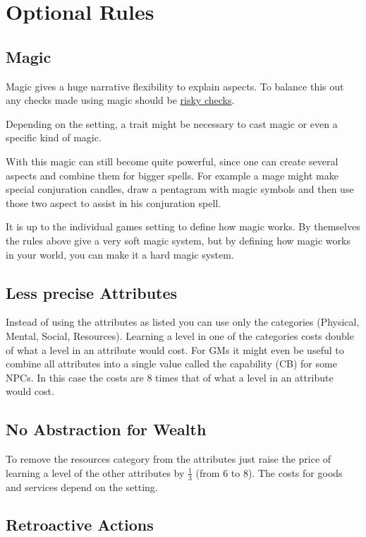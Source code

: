 \documentclass[11pt]{article}
\begin{document}
{\section{Optional Rules}
\label{sec:orgd018f16}
\subsection{Magic}
\label{sec:orgdef8201}

Magic gives a huge narrative flexibility to explain aspects. To balance this out any checks made using magic should be \hyperref[sec:org94c7aba]{risky checks}.

Depending on the setting, a trait might be necessary to cast magic or even a specific kind of magic.

With this magic can still become quite powerful, since one can create several aspects and combine them for bigger spells. For example a mage might make special conjuration candles, draw a pentagram with magic symbols and then use those two aspect to assist in his conjuration spell.

It is up to the individual games setting to define how magic works. By themselves the rules above give a very soft magic system, but by defining how magic works in your world, you can make it a hard magic system. 

\subsection{Less precise Attributes}
\label{sec:orgad1ec5a}
Instead of using the attributes as listed you can use only the categories (Physical, Mental, Social, Resources). Learning a level in one of the categories costs double of what a level in an attribute would cost.
For GMs it might even be useful to combine all attributes into a single value called the capability (CB) for some NPCs. In this case the costs are 8 times that of what a level in an attribute would cost.

\subsection{No Abstraction for Wealth}
\label{sec:org152ed25}

To remove the resources category from the attributes just raise the price of learning a level of the other attributes by \(\frac{1}{3}\) (from 6 to 8). The costs for goods and services
depend on the setting.
\subsection{Retroactive Actions}
\label{sec:orgdbf1930}

}
\end{document}
